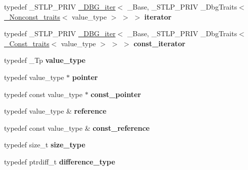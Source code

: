 \begin{DoxyCompactItemize}
\item 
\mbox{\label{classdeque_a943efd290ef9a91732600341390fd1eb}} 
typedef \+\_\+\+S\+T\+L\+P\+\_\+\+P\+R\+IV \hyperlink{struct___d_b_g__iter}{\+\_\+\+D\+B\+G\+\_\+iter}$<$ \+\_\+\+Base, \+\_\+\+S\+T\+L\+P\+\_\+\+P\+R\+IV \+\_\+\+Dbg\+Traits$<$ \hyperlink{struct___nonconst__traits}{\+\_\+\+Nonconst\+\_\+traits}$<$ value\+\_\+type $>$ $>$ $>$ {\bfseries iterator}
\item 
\mbox{\label{classdeque_ad889223d0a461e09f08b690a4efc6a3e}} 
typedef \+\_\+\+S\+T\+L\+P\+\_\+\+P\+R\+IV \hyperlink{struct___d_b_g__iter}{\+\_\+\+D\+B\+G\+\_\+iter}$<$ \+\_\+\+Base, \+\_\+\+S\+T\+L\+P\+\_\+\+P\+R\+IV \+\_\+\+Dbg\+Traits$<$ \hyperlink{struct___const__traits}{\+\_\+\+Const\+\_\+traits}$<$ value\+\_\+type $>$ $>$ $>$ {\bfseries const\+\_\+iterator}
\item 
\mbox{\label{classdeque_a4beaa2826510a15103b4e01d1faa31df}} 
typedef \+\_\+\+Tp {\bfseries value\+\_\+type}
\item 
\mbox{\label{classdeque_a6101907d1272b65463cc77121e94bef6}} 
typedef value\+\_\+type $\ast$ {\bfseries pointer}
\item 
\mbox{\label{classdeque_abe3f48b8db12ae2d2e1c8b732e3563b5}} 
typedef const value\+\_\+type $\ast$ {\bfseries const\+\_\+pointer}
\item 
\mbox{\label{classdeque_a5763152ecaa38821b1dfb96f57964d22}} 
typedef value\+\_\+type \& {\bfseries reference}
\item 
\mbox{\label{classdeque_a9be701298b98770dcf6e04597fdde160}} 
typedef const value\+\_\+type \& {\bfseries const\+\_\+reference}
\item 
\mbox{\label{classdeque_a78fc9a20c7832fb52ecb94ed854b00dd}} 
typedef size\+\_\+t {\bfseries size\+\_\+type}
\item 
\mbox{\label{classdeque_aa0a0ce4ae8792f5e47bb17bbf8c01e80}} 
typedef ptrdiff\+\_\+t {\bfseries difference\+\_\+type}
\item 
\mbox{\label{classdeque_af1427a66623140cd21ce1754e732eae0}} 

\end{DoxyCompactItemize}
